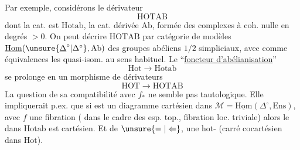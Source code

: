 Par exemple, considérons le dérivateur
\[
\mathrm{HOTAB}
\]
dont la cat.  est $\mathrm{Hotab}$, la  cat. dérivée
   $\mathrm{Ab}$,  formée des complexes  à coh. nulle en degrés $>0$.
On peut décrire $\mathrm{HOTAB}$ par  catégorie de modèles $\underline{\mathrm{Hom}}(\unsure{\underline{\Delta}^{\circ}|\Delta^{\circ}},\mathrm{Ab})$ des groupes abéliens $1/2$ simpliciaux, avec comme équivalences  les quasi-isom. au sens habituel. Le ``\uline{foncteur d'abélianisation}''  
\[
\mathrm{Hot}\longrightarrow\mathrm{Hotab}
\]
se prolonge en un morphisme de dérivateurs
\[
\mathrm{HOT}\longrightarrow\mathrm{HOTAB}
\]
La question de sa compatibilité avec $f_*$ ne semble pas tautologique. Elle  impliquerait p.ex. que si
est un diagramme cartésien dans $\mathcal M=\underline{\mathrm{Hom}}(\Delta^\circ,\mathrm{Ens})$,
avec $f$ une fibration ( dans le cadre des esp. top.,   fibration loc. triviale) alors le  dans $\mathrm{Hotab}$
est cartésien.  Et de $\unsure{=|\Leftarrow}$,  une hot- (carré cocartésien dans $\mathrm{Hot}$).
